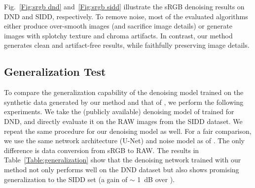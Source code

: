\documentclass[10pt,twocolumn,letterpaper]{article}
\begin{document}
Fig.~\ref{Fig:srgb dnd} and~\ref{Fig:srgb sidd} illustrate the sRGB denoising results on DND and SIDD, respectively.
To remove noise, most of the evaluated algorithms either produce over-smooth images (and sacrifice image details) or generate images with splotchy texture and chroma artifacts.
In contrast, our method generates clean and artifact-free results, while faithfully preserving image details. 





\subsection{Generalization Test}
To compare the generalization capability of the denoising model trained on the synthetic data generated by our method and that of \cite{Brooks2019}, we perform the following experiments. 
We take the (publicly available) denoising model of \cite{Brooks2019} trained for DND, and directly evaluate it on the RAW images from the SIDD dataset. 
We repeat the same procedure for our denoising model as well.
For a fair comparison, we use the same network architecture (U-Net) and noise model as of \cite{Brooks2019}. 
The only difference is data conversion from sRGB to RAW. 
The results in Table~\ref{Table:generalization} show that the denoising network trained with our method not only performs well on the DND dataset but also shows promising generalization to the SIDD set (a gain of $\sim$ 1~dB over \cite{Brooks2019}). 







\begin{table}[t]
\begin{center}
\caption{Generalization Test. U-Net model is trained only for DND \cite{dnd} with our technique and with the UPI \cite{Brooks2019} method, and directly evaluated on the SIDD dataset \cite{sidd}.}\vspace{-2.5mm}
\label{Table:generalization}
\setlength{\tabcolsep}{16.5pt}
\end{center}\vspace{-1.4em}
\end{table}
\end{document}
